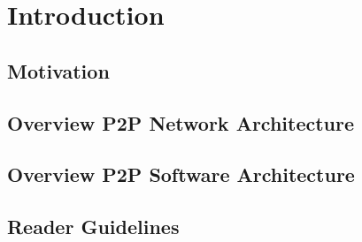 \section{Introduction}

\subsection{Motivation}

\subsection{Overview P2P Network Architecture}

\subsection{Overview P2P Software Architecture}

\subsection{Reader Guidelines}
